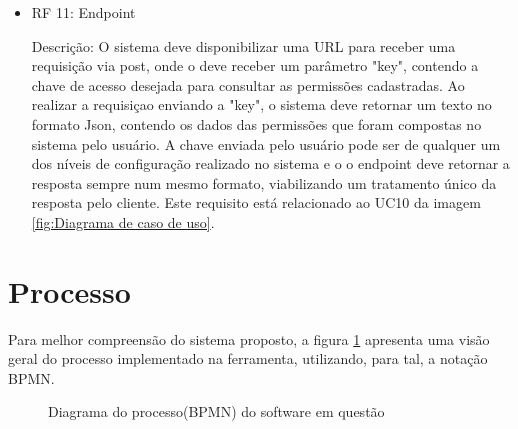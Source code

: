 \begin{itemize}
\item RF 11: Endpoint


Descrição: O sistema deve disponibilizar uma URL para receber uma requisição via post, onde o deve receber um parâmetro "key", contendo a chave de acesso desejada para consultar as permissões cadastradas. Ao realizar a requisiçao enviando a "key", o sistema deve retornar um texto no formato Json, contendo os dados das permissões que foram compostas no sistema pelo usuário. A chave enviada pelo usuário pode ser de qualquer um dos níveis de configuração realizado no sistema e o o endpoint deve retornar a resposta sempre num mesmo formato, viabilizando um tratamento único da resposta pelo cliente. Este requisito está relacionado ao UC10 da imagem \ref{fig:Diagrama de caso de uso}.


\end{itemize}

\section{Processo}\label{sec:processo}


Para melhor compreensão do sistema proposto, a figura \ref{fig:diagramaBpmn} apresenta uma visão geral do processo implementado na ferramenta, utilizando, para tal, a notação BPMN.


\begin{figure} %
	\vspace*{-2cm}
	\label{fig:diagramaBpmn}
	\caption{Diagrama do processo(BPMN) do software em questão}
\end{figure}


